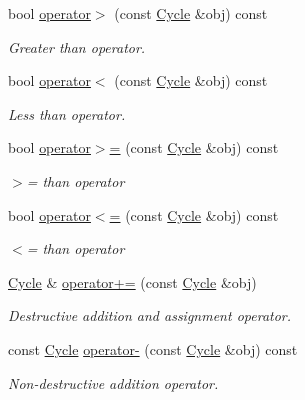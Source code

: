 \begin{DoxyCompactItemize}
bool \hyperlink{classcryomesh_1_1common_1_1Cycle_afd820cd18549a6473004584e0ea20dc2}{operator$>$} (const \hyperlink{classcryomesh_1_1common_1_1Cycle}{\-Cycle} \&obj) const 
\begin{DoxyCompactList}\small\item\em \-Greater than operator. \end{DoxyCompactList}\item 
bool \hyperlink{classcryomesh_1_1common_1_1Cycle_a7c81026bf214be012717ce71472b4d1d}{operator$<$} (const \hyperlink{classcryomesh_1_1common_1_1Cycle}{\-Cycle} \&obj) const 
\begin{DoxyCompactList}\small\item\em \-Less than operator. \end{DoxyCompactList}\item 
bool \hyperlink{classcryomesh_1_1common_1_1Cycle_a88304063eceb877cfefc5ce707a8e2a6}{operator$>$=} (const \hyperlink{classcryomesh_1_1common_1_1Cycle}{\-Cycle} \&obj) const 
\begin{DoxyCompactList}\small\item\em $>$= than operator \end{DoxyCompactList}\item 
bool \hyperlink{classcryomesh_1_1common_1_1Cycle_af4129a01aee0e3285d3d7354a02e9f8a}{operator$<$=} (const \hyperlink{classcryomesh_1_1common_1_1Cycle}{\-Cycle} \&obj) const 
\begin{DoxyCompactList}\small\item\em $<$= than operator \end{DoxyCompactList}\item 
\hyperlink{classcryomesh_1_1common_1_1Cycle}{\-Cycle} \& \hyperlink{classcryomesh_1_1common_1_1Cycle_aba766561a03d089461cf2f59c6a4e9b9}{operator+=} (const \hyperlink{classcryomesh_1_1common_1_1Cycle}{\-Cycle} \&obj)
\begin{DoxyCompactList}\small\item\em \-Destructive addition and assignment operator. \end{DoxyCompactList}\item 
const \hyperlink{classcryomesh_1_1common_1_1Cycle}{\-Cycle} \hyperlink{classcryomesh_1_1common_1_1Cycle_a2c8b5be6e8ce87e4994cf1aa5e5db104}{operator-\/} (const \hyperlink{classcryomesh_1_1common_1_1Cycle}{\-Cycle} \&obj) const 
\begin{DoxyCompactList}\small\item\em \-Non-\/destructive addition operator. \end{DoxyCompactList}\item 

\end{DoxyCompactItemize}
